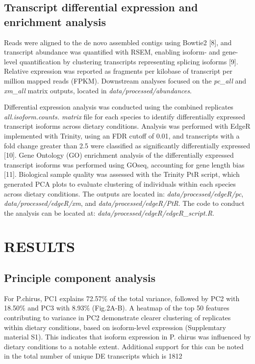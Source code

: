 \documentclass[12pt,]{article}
\begin{document}
\subsection{Transcript differential expression and enrichment
analysis}\label{transcript-differential-expression-and-enrichment-analysis}

Reads were aligned to the de novo assembled contigs using Bowtie2
{[}8{]}, and transcript abundance was quantified with RSEM, enabling
isoform- and gene-level quantification by clustering transcripts
representing splicing isoforms {[}9{]}. Relative expression was reported
as fragments per kilobase of transcript per million mapped reads (FPKM).
Downstream analyses focused on the \emph{pc\_all} and \emph{xm\_all}
matrix outputs, located in \emph{data/processed/abundances}.

Differential expression analysis was conducted using the combined
replicates \emph{all.isoform.counts. matrix} file for each species to
identify differentially expressed transcript isoforms across dietary
conditions. Analysis was performed with EdgeR implemented with Trinity,
using an FDR cutoff of 0.01, and transcripts with a fold change greater
than 2.5 were classified as significantly differentially expressed
{[}10{]}. Gene Ontology (GO) enrichment analysis of the differentially
expressed transcript isoforms was performed using GOseq, accounting for
gene length bias {[}11{]}. Biological sample quality was assessed with
the Trinity PtR script, which generated PCA plots to evaluate clustering
of individuals within each species across dietary conditions. The
outputs are located in: \emph{data/processed/edgeR/pc},
\emph{data/processed/edgeR/xm}, and \emph{data/processed/edgeR/PtR}. The
code to conduct the analysis can be located at:
\emph{data/processed/edgeR/edgeR\_script.R}.

\section{RESULTS}\label{results}

\subsection{Principle component
analysis}\label{principle-component-analysis}

For P.chirus, PC1 explains 72.57\% of the total variance, followed by
PC2 with 18.50\% and PC3 with 8.93\% (Fig.2A-B). A heatmap of the top 50
features contributing to variance in PC2 demonstrate clearer clustering
of replicates within dietary conditions, based on isoform-level
expression (Supplemtary material S1). This indicates that isoform
expression in P. chirus was influenced by dietary conditions to a
notable extent. Additional support for this can be noted in the total
number of unique DE transcripts which is 1812
\end{document}
